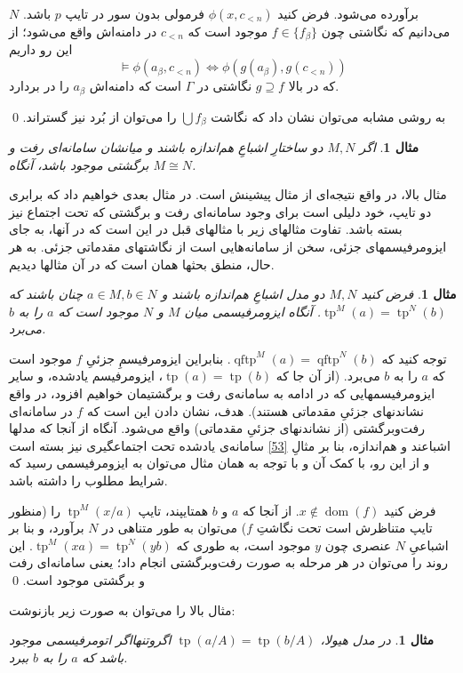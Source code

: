 \documentclass[12pt,a4paper]{report}
\theoremstyle{colorhead}
\newtheorem{mesal}[thm]{مثال}
\DeclareMathOperator{\qftp}{qftp}
\DeclareMathOperator{\dom}{dom}
\DeclareMathOperator{\tp}{tp}
\begin{document}
$N$
برآورده می‌شود. فرض کنید
$\phi(x,c_{<n})$
فرمولی بدون سور در تایپ
$p$
باشد. می‌دانیم که نگاشتی چون
$f\in \{f_{\beta}\}$
موجود است که
$c_{<n}$
در دامنه‌اش واقع می‌شود؛ از این رو داریم
\[
\models \phi(a_\beta,c_{<n})\Leftrightarrow \phi(g(a_\beta),g(c_{<n}))
\]
که در بالا
$g\supseteq f$
نگاشتی در
$\Gamma$
است که دامنه‌اش 
$a_\beta$
را در بردارد. 
\par 
به روشی مشابه می‌توان نشان داد که نگاشت
$\bigcup f_\beta$
را می‌توان از بُرد نیز گستراند.
\qed
\begin{mesal}
اگر 
$M,N$
دو ساختارِ اشباعِ هم‌اندازه باشند و میانشان سامانه‌ای رفت و برگشتی موجود باشد، آنگاه
$M\cong N$.
\end{mesal}
مثال بالا، در واقع نتیجه‌ای از مثال پیشینش است. در مثال بعدی خواهیم داد که برابری دو تایپ، خود دلیلی است برای وجود سامانه‌ای رفت و برگشتی که تحت اجتماع نیز بسته باشد.
تفاوت مثالهای زیر با مثالهای قبل در این است که در آنها، به جای
ایزومرفیسمهای جزئی،
 سخن از سامانه‌هایی است از 
نگاشتهای مقدماتی جزئی. به هر حال، منطق بحثها همان است که در آن مثالها دیدیم. 
\begin{mesal}
فرض کنید
$M,N$
دو مدل اشباعِ هم‌اندازه باشند و 
$a\in M, b\in N$
چنان باشند که
$\tp^M(a)=\tp^N(b)$.
آنگاه ایزومرفیسمی میان 
$M$
و
$N$
موجود است که
$a$
را به 
$b$
می‌برد. 
\end{mesal}
توجه کنید که
$\qftp^M(a)=\qftp^N(b)$.
بنابراین
ایزومرفیسمِ جزئیِ
$f$
موجود است که 
$a$
را به
$b$
می‌برد.
(از  آن جا  که
$\tp(a)=\tp(b)$،
ایزومرفیسم یادشده، و
سایر ایزومرفیسمهایی که در ادامه به سامانه‌ی رفت و برگشتیمان خواهیم افزود،
 در  واقع نشاندنهای جزئیِ  مقدماتی هستند). 
هدف، نشان دادن این است که 
$f$
در سامانه‌ای رفت‌وبرگشتی (از نشاندنهای جزئیِ مقدماتی)
 واقع می‌شود. آنگاه از آنجا که مدلها
اشباعند و هم‌اندازه،
بنا بر
مثالِ
\ref{53}
 سامانه‌ی یادشده تحت اجتماعگیری نیز بسته است و از این رو، با کمک آن 
و با توجه به 
همان مثال
می‌توان
به ایزومرفیسمی رسید که شرایط مطلوب را داشته باشد.
\par 
فرض کنید
$x\not \in \dom(f)$.
از آنجا که
$a$
و
$b$
همتایپند، 
تایپ
$\tp^M(x/a)$
را
(منظور تایپ متناظرش است تحت نگاشتِ
$f$)
 می‌توان به طور متناهی در 
$N$
برآورد، و بنا بر اشباعیِ 
$N$
عنصری چون
$y$
موجود است، به طوری که
$\tp^M(xa)=\tp^N(yb)$.
این روند را می‌توان در هر مرحله به صورت رفت‌وبرگشتی انجام داد؛ یعنی سامانه‌ای رفت و برگشتی موجود است. 
\qed
\par 
مثال بالا را می‌توان به صورت زیر بازنوشت:
\begin{mesal}
در مدل هیولا،
$\tp(a/A)=\tp(b/A)$
اگروتنهااگر اتومرفیسمی موجود باشد که
$a$
را 
به
$b$
ببرد. 
\end{mesal}
\end{document}
